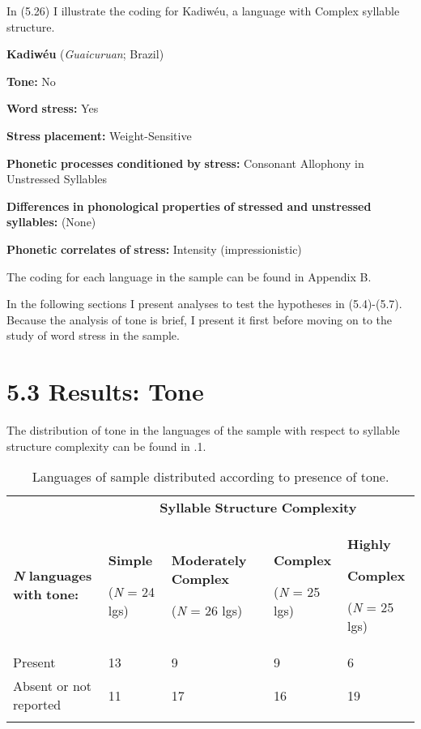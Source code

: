   In (5.26) I illustrate the coding for Kadiwéu, a language with Complex syllable structure.

\ea\label{ex:(5.26)}
  \textbf{Kadiwéu} (\textit{Guaicuruan}; Brazil)

\textbf{Tone:} No

\textbf{Word} \textbf{stress:} Yes

\textbf{Stress} \textbf{placement:} Weight-Sensitive

\textbf{Phonetic} \textbf{processes} \textbf{conditioned} \textbf{by} \textbf{stress:} Consonant Allophony in Unstressed Syllables

\textbf{Differences} \textbf{in} \textbf{phonological} \textbf{properties} \textbf{of} \textbf{stressed} \textbf{and} \textbf{unstressed} \textbf{syllables:} (None)

\textbf{Phonetic} \textbf{correlates} \textbf{of} \textbf{stress:} Intensity (impressionistic)

\z

The coding for each language in the sample can be found in Appendix B.

  In the following sections I present analyses to test the hypotheses in (5.4)-(5.7). Because the analysis of tone is brief, I present it first before moving on to the study of word stress in the sample.

\section{5.3 Results: Tone}

  The distribution of tone in the languages of the sample with respect to syllable structure complexity can be found in .1.

\begin{table}
\begin{tabularx}{\textwidth}{XXXXX}
\lsptoprule
 & \multicolumn{4}{c}{ \textbf{Syllable} \textbf{Structure} \textbf{Complexity}}\\
 \textbf{\textit{N}} \textbf{languages} \textbf{with} \textbf{tone:} & { \textbf{Simple}}

 (\textit{N} = 24 lgs) & { \textbf{Moderately} \textbf{Complex}}

 (\textit{N} = 26 lgs) & { \textbf{Complex}}

 (\textit{N} = 25 lgs) & { \textbf{Highly} }

{ \textbf{Complex}}

 (\textit{N} = 25 lgs)\\
 Present & 13 & 9 & 9 & 6\\
 Absent or not reported & 11 & 17 & 16 & 19\\
\lspbottomrule
\end{tabularx}
\caption{\label{5.1}Languages of sample distributed according to presence of tone.}
\end{table}

